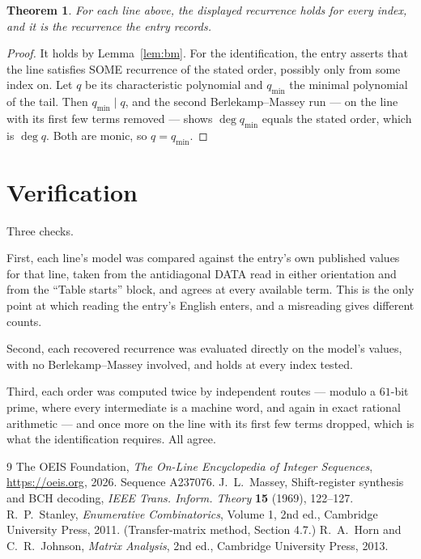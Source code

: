\documentclass[11pt,a4paper]{article}
\theoremstyle{plain}
\newtheorem{theorem}{Theorem}
\theoremstyle{definition}
\begin{document}
\begin{theorem}
For each line above, the displayed recurrence holds for every index, and it is the recurrence
the entry records.
\end{theorem}

\begin{proof}
It holds by Lemma~\ref{lem:bm}. For the identification, the entry asserts that the line
satisfies SOME recurrence of the stated order, possibly only from some index on. Let $q$ be its
characteristic polynomial and $q_{\min}$ the minimal polynomial of the tail. Then
$q_{\min}\mid q$, and the second Berlekamp--Massey run --- on the line with its first few
terms removed --- shows $\deg q_{\min}$ equals the stated order, which is $\deg q$. Both are
monic, so $q=q_{\min}$.
\end{proof}

\section{Verification}

Three checks.

First, each line's model was compared against the entry's own published values for that line,
taken from the antidiagonal DATA read in either orientation and from the ``Table starts''
block, and agrees at every available term. This is the only point at which reading the entry's
English enters, and a misreading gives different counts.

Second, each recovered recurrence was evaluated directly on the model's values, with no
Berlekamp--Massey involved, and holds at every index tested.

Third, each order was computed twice by independent routes --- modulo a $61$-bit prime, where
every intermediate is a machine word, and again in exact rational arithmetic --- and once more
on the line with its first few terms dropped, which is what the identification requires. All
agree.

\begin{thebibliography}{9}
 The OEIS Foundation, \emph{The On-Line Encyclopedia of Integer
Sequences}, \url{https://oeis.org}, 2026. Sequence A237076.
 J.~L.~Massey, Shift-register synthesis and BCH decoding, \emph{IEEE
Trans. Inform. Theory} \textbf{15} (1969), 122--127.
 R.~P.~Stanley, \emph{Enumerative Combinatorics}, Volume 1, 2nd ed.,
Cambridge University Press, 2011. (Transfer-matrix method, Section 4.7.)
 R.~A.~Horn and C.~R.~Johnson, \emph{Matrix Analysis}, 2nd ed., Cambridge
University Press, 2013.
\end{thebibliography}
\end{document}
